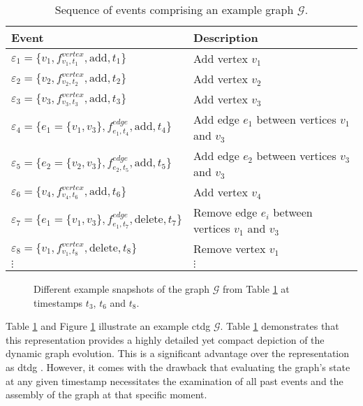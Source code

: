 \begin{table}[h]
    \centering
    \begin{tabular}{|l|l|}
        \hline
        Event & Description \\
        \hline
        $\varepsilon_{1} = \{v_1, f^{vertex}_{v_1, t_1}, \mathrm{add}, t_1\}$ & Add vertex $v_1$\\
        $\varepsilon_{2} = \{v_2, f^{vertex}_{v_2, t_2}, \mathrm{add}, t_2\}$ & Add vertex $v_2$\\
        $\varepsilon_{3} = \{v_3, f^{vertex}_{v_3, t_3}, \mathrm{add}, t_3\}$ & Add vertex $v_3$\\
        $\varepsilon_{4} = \{e_1 = \{v_1, v_3\}, f^{edge}_{e_1, t_4}, \mathrm{add}, t_4\}$ & Add edge $e_1$ between vertices $v_1$ and $v_3$\\
        $\varepsilon_{5} = \{e_2 = \{v_2, v_3\}, f^{edge}_{e_2, t_5}, \mathrm{add}, t_5\}$ & Add edge $e_2$ between vertices $v_3$ and $v_3$\\
        $\varepsilon_{6} = \{v_4, f^{vertex}_{v_4, t_6}, \mathrm{add}, t_6\}$ & Add vertex $v_4$\\
        $\varepsilon_{7} = \{e_1 = \{v_1, v_3\}, f^{edge}_{e_1, t_7}, \mathrm{delete}, t_7\}$ & Remove edge $e_i$ between vertices $v_1$ and $v_3$\\
        $\varepsilon_{8} = \{v_1, f^{vertex}_{v_1, t_8}, \mathrm{delete}, t_8\}$ & Remove vertex $v_1$\\
        $\vdots$ & $\vdots$ \\
    \end{tabular}
    \caption{Sequence of events comprising an example graph $\mathcal{G}.$}
    \label{t_ctdg_events}
\end{table}

\begin{figure}[ht]
    
    \caption{Different example snapshots of the graph $\mathcal{G}$ from Table \ref{t_ctdg_events} at timestamps $t_3$, $t_6$ and $t_8$.}
    \label{f_ctdg}
\end{figure}

Table \ref{t_ctdg_events} and Figure \ref{f_ctdg} illustrate an example \gls{ctdg} $\mathcal{G}$. Table \ref{t_ctdg_events} demonstrates that this representation provides a highly detailed yet compact depiction of the dynamic graph evolution. This is a significant advantage over the representation as \gls{dtdg} \cite{trivedi_dyrep_2019}. However, it comes with the drawback that evaluating the graph's state at any given timestamp necessitates the examination of all past events and the assembly of the graph at that specific moment.


